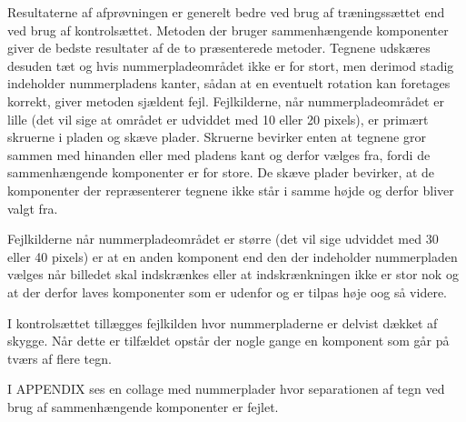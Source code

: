 Resultaterne af afprøvningen er generelt bedre ved brug af træningssættet end ved brug af kontrolsættet. Metoden der bruger sammenhængende komponenter giver de bedste resultater af de to præsenterede metoder. Tegnene udskæres desuden tæt og hvis nummerpladeområdet ikke er for stort, men derimod stadig indeholder nummerpladens kanter, sådan at en eventuelt rotation kan foretages korrekt, giver metoden sjældent fejl. Fejlkilderne, når nummerpladeområdet er lille (det vil sige at området er udviddet med 10 eller 20 pixels), er primært skruerne i pladen og skæve plader. Skruerne bevirker enten at tegnene gror sammen med hinanden eller med pladens kant og derfor vælges fra, fordi de sammenhængende komponenter er for store. De skæve plader bevirker, at de komponenter der repræsenterer tegnene ikke står i samme højde og derfor bliver valgt fra.


Fejlkilderne når nummerpladeområdet er større (det vil sige udviddet med 30 eller 40 pixels) er at en anden komponent end den der indeholder nummerpladen vælges når billedet skal indskrænkes eller at indskrænkningen ikke er stor nok og at der derfor laves komponenter som er udenfor og er tilpas høje oog så videre.


I kontrolsættet tillægges fejlkilden hvor nummerpladerne er delvist dækket af skygge. Når dette er tilfældet opstår der nogle gange en komponent som går på tværs af flere tegn.

I APPENDIX ses en collage med nummerplader hvor separationen af tegn ved brug af sammenhængende komponenter er fejlet.




